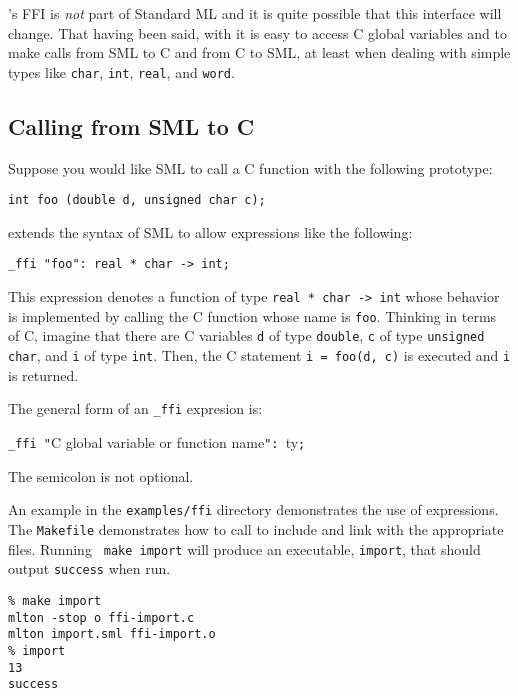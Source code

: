 
{\mlton}'s FFI is {\em not} part of Standard ML and it is quite
possible that this interface will change.  That having been said, with
{\mlton} it is easy to access C global variables and to make calls
from SML to C and from C to SML, at least when dealing with simple
types like {\tt char}, {\tt int}, {\tt real}, and {\tt word}.

\subsection{Calling from SML to C}
Suppose you would like SML to call a C function with the following
prototype:
\begin{verbatim}
int foo (double d, unsigned char c);
\end{verbatim}
{\mlton} extends the syntax of SML to allow expressions like the following:
\begin{verbatim}
_ffi "foo": real * char -> int;
\end{verbatim}
This expression denotes a function of type {\tt real * char -> int}
whose behavior is implemented by calling the C function whose name is
{\tt foo}.  Thinking in terms of C, imagine that there are C
variables {\tt d} of type {\tt double}, {\tt c} of type {\tt unsigned
char}, and {\tt i} of type {\tt int}.  Then, the C statement
\mbox{\tt i = foo(d, c)} is executed and {\tt i} is returned.

The general form of an \verb+_ffi+ expresion is:
\begin{center}
{\tt \_ffi "}C global variable or function name{\tt ": }ty{\tt ;}
\end{center}
The semicolon is not optional.

An example in the {\tt examples/ffi} directory demonstrates the use of
{\ffi} expressions.  The {\tt Makefile} demonstrates how to call
{\mlton} to include and link with the appropriate files.  Running {\tt
make import} will produce an executable, {\tt import}, that should
output {\tt success} when run.

\begin{verbatim}
% make import
mlton -stop o ffi-import.c
mlton import.sml ffi-import.o
% import
13
success
\end{verbatim}

